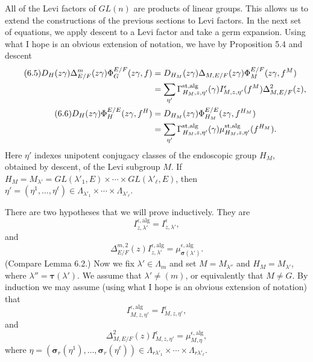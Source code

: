 \documentclass{amsart}
\begin{document}
All of the Levi factors of $GL(n)$ are products of linear groups.  This
allows us to extend the constructions of the previous sections to Levi factors.
In the next set of equations, we apply descent to a Levi factor and take
a germ expansion.  Using what I hope is an obvious extension of notation,
we have by Proposition 5.4 and descent
\begin{align*}\tag{6.5}
  D_{H}(z\gamma)\Delta^m_{E/F}(z\gamma)\Phi^{E/F}_G(z\gamma,f)
  &=
    D_{H_M}(z\gamma)\Delta_{M,E/F}(z\gamma)\Phi^{E/F}_M(z\gamma,f^M) \\
\vspace{4pt}
  &=
    \sum_{\eta'} \Gamma^{\text{st,alg}}_{H_M,z,\eta'}(\gamma)
                 I^{\epsilon}_{M,z,\eta'}(f^M)
  \Delta_{M,E/F}^{2}(z),\label{eqn:6.5} \\ %
%
\tag{6.6}
D_{H}(z\gamma)\Phi^{E/E}_H(z\gamma,f^H)
  &=
     D_{H_M}(z\gamma)\Phi^{E/E}_{H_M}(z\gamma,f^{H_M}) \\
\vspace{4pt}
    &=
     \sum_{\eta'}\Gamma^{\text{st,alg}}_{H_M,z,\eta'}(\gamma)
                 \mu^{\text{st,alg}}_{H_M,z,\eta'}(f^{H_M}). \label{eqn:6.6}
\end{align*}
Here $\eta'$ indexes unipotent conjugacy classes of the endoscopic group $H_M$,
obtained by descent, of the Levi subgroup $M$.  If
$H_M = M_{\lambda'} = GL(\lambda'_1,E)\times\cdots\times GL(\lambda'_\ell,E)$, then
$\eta' = (\eta^1,\ldots,\eta^\ell)\in
   \Lambda_{\lambda'_1}\times\cdots\times \Lambda_{\lambda'_\ell}$.

There are two hypotheses that we will prove inductively.  They
are
\begin{equation}\label{eqn:tag1}\tag{1}
I^{\epsilon,\text{alg}}_{z,\lambda'} =
I^{\epsilon}_{z,\lambda'},%
\end{equation}
and
\begin{equation}\label{eqn:tag2}\tag{2}
\Delta^{m,2}_{E/F}(z)I^{\epsilon,\text{alg}}_{z,\lambda'} =
  \mu^{\epsilon,\text{alg}}_{\pmb\sigma(\lambda')}. 
\end{equation}
(Compare Lemma 6.2.)
Now we fix $\lambda'\in\Lambda_m$ and set $M=M_{\lambda''}$ and  $H_M = M_{\lambda'}$,
where $\lambda'' = \pmb\tau(\lambda')$.  We assume that $\lambda'\ne(m)$, or
equivalently that $M\ne G$.  By induction we may assume (using what I hope
is an obvious extension of notation) that
\begin{equation}\label{eqn:tag1'}\tag{$1'$}
I^{\epsilon,\text{alg}}_{M,z,\eta'} =
I^{\epsilon}_{M,z,\eta'}, %
\end{equation}
and
\begin{equation}\label{eqn:tag2'}\tag{$2'$}
\Delta^{2}_{M,E/F}(z)I^\epsilon_{M,z,\eta'} =
\mu^{\epsilon,\text{alg}}_{M,\eta},%
\end{equation}
where $\eta =(\pmb\sigma_r(\eta^1),\ldots,\pmb\sigma_r(\eta^\ell))\in
   \Lambda_{r\lambda'_1}\times\cdots\times \Lambda_{r\lambda'_\ell}$.
\end{document}

